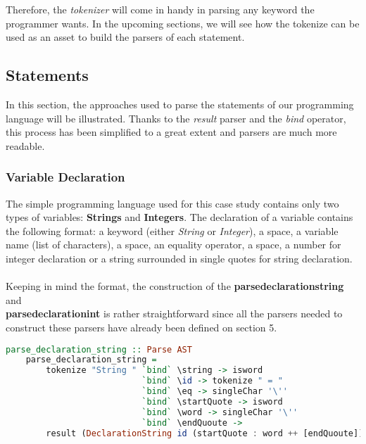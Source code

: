 \documentclass[a4paper, onecolumn]{article}
\begin{document}
    \noindent Therefore, the \textit{tokenizer} will come in handy in parsing any keyword the programmer wants. In the upcoming sections, we will see how the tokenize can be used as an asset to build the parsers of each statement. 
    
    \subsection{Statements}
    
    In this section, the approaches used to parse the statements of our programming language will be illustrated. Thanks to the \textit{result} parser and the \textit{bind} operator, this process has been simplified to a great extent and parsers are much more readable. 
    
    \subsubsection{Variable Declaration}
    
    The simple programming language used for this case study contains only two types of variables: \textbf{Strings} and \textbf{Integers}. The declaration of a variable contains the following format: a keyword (either \textit{String} or \textit{Integer}), a space, a variable name (list of characters), a space, an equality operator, a space, a number for integer declaration or a string surrounded in single quotes for string declaration. \\ \\
    Keeping in mind the format, the construction of the \textbf{parse\textunderscore declaration\textunderscore string} and \\ \textbf{parse\textunderscore declaration\textunderscore int} is rather straightforward since all the parsers needed to construct these parsers have already been defined on section 5.
    
    \begin{tcolorbox}
    \begin{lstlisting}[language=Haskell] 
    parse_declaration_string :: Parse AST
    parse_declaration_string = 
        tokenize "String " `bind` \string -> isword 
                           `bind` \id -> tokenize " = "          
                           `bind` \eq -> singleChar '\''  
                           `bind` \startQuote -> isword 
                           `bind` \word -> singleChar '\''    
                           `bind` \endQuoute -> 
        result (DeclarationString id (startQuote : word ++ [endQuoute])) 
     \end{lstlisting}
    \end{tcolorbox}
    
\end{document}
